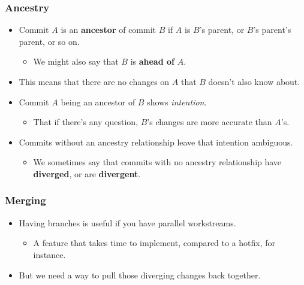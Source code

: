 \documentclass{beamer}
\begin{document}
\begin{frame}
\begin{center}
  \end{center}
\end{frame}

\begin{frame}
  \frametitle{Ancestry}
  
  \begin{itemize}
    \pause
  \item Commit $A$ is an \textbf{ancestor} of commit $B$ if $A$ is $B$'s parent, or $B$'s parent's parent, or so on.
    \pause
    \begin{itemize}
      \pause
    \item We might also say that $B$ is \textbf{ahead of} $A$.
    \end{itemize}
  \item This means that there are no changes on $A$ that $B$ doesn't also know about.
    \pause
  \item Commit $A$ being an ancestor of $B$ shows \textit{intention}.
    \begin{itemize}
      \pause
    \item That if there's any question, $B$'s changes are more accurate than $A$'s.
    \end{itemize}
    \pause
  \item Commits without an ancestry relationship leave that intention ambiguous.
    \begin{itemize}
      \pause
    \item We sometimes say that commits with no ancestry relationship have \textbf{diverged}, or are \textbf{divergent}.
    \end{itemize}
  \end{itemize}
\end{frame}

\begin{frame}
  \frametitle{Merging}

  \begin{itemize}
    \pause
  \item Having branches is useful if you have parallel workstreams.
    \begin{itemize}
      \pause
    \item A feature that takes time to implement, compared to a hotfix, for instance.
    \end{itemize}
    \pause
  \item But we need a way to pull those diverging changes back together.
  \end{itemize}
\end{frame}
\end{document}
